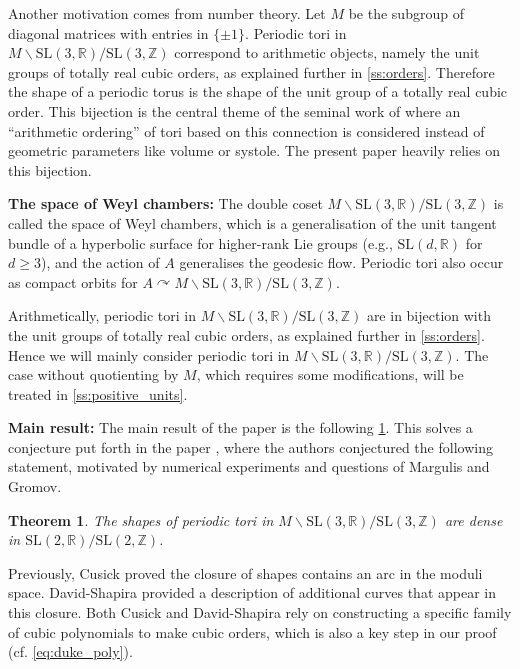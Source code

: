 \documentclass[11pt,letterpaper]{amsart}
\newtheorem{theorem}{Theorem}[section]
\theoremstyle{definition}
\theoremstyle{remark}
\renewcommand{\rm}[1]{\mathrm{#1}}
\newcommand{\cal}[1]{\mathcal{#1}}
\newcommand{\bb}[1]{\mathbb{#1}}
\newcommand{\R}{\bb R}
\newcommand{\Z}{\bb Z}
\newcommand{\calO}{\cal O}
\newcommand{\SL}{\rm{SL}}
\newcommand{\thi}{\color{olive}}
\begin{document}
	Another motivation comes from number theory.
	Let $M$ be the subgroup of diagonal matrices with entries in $\lbrace \pm 1 \rbrace$.
	Periodic tori in $M \backslash \SL(3,\R)/\SL(3,\Z)$ correspond to arithmetic objects, namely the unit groups of totally real cubic orders, as explained further in \cref{ss:orders}.
	Therefore the shape of a periodic torus is the shape of the unit group of a totally real cubic order. This bijection is the central theme of the seminal work of \cite{einsiedler_distribution_2011} where an ``arithmetic ordering'' of {tori} based on this connection is considered instead of geometric parameters like volume or systole. The present paper heavily relies on this bijection.

	
	\textbf{The space of Weyl chambers:}
	     The double coset $ M \backslash \SL(3,\R)/\SL(3,\Z)$ is called the space of Weyl chambers, which is a generalisation of the unit tangent bundle of a hyperbolic surface for higher-rank Lie groups (e.g., $\SL(d,\R)$ for $d\geq 3$), and the action of $A$ generalises the geodesic flow. Periodic tori also occur as compact orbits for $A \curvearrowright M \backslash \SL(3,\R)/\SL(3,\Z)$. 
    
	
	Arithmetically, periodic tori in $M \backslash \SL(3,\R)/\SL(3,\Z)$ are in bijection with the unit groups of totally real cubic orders, as explained further in \cref{ss:orders}. 
	Hence we will mainly consider periodic tori in $M \backslash \SL(3,\R)/\SL(3,\Z)$.
	The case without quotienting by $M$, which requires some modifications, will be treated in \cref{ss:positive_units}.
	
	
	
	\textbf{Main result:}
	{The main result of the paper is the following \cref{co:ds}.}
	This solves a conjecture put forth in the paper \cite{davidShapesUnitLattices2017}, where the authors conjectured the following statement, motivated by numerical experiments 
	and questions of Margulis and Gromov.
	\begin{theorem}
	    \label{co:ds}
		The shapes of periodic tori in $ M\backslash \SL(3,\R)/\SL(3,\Z)$ are dense in $\SL(2,\R)/\SL(2,\Z)$.
	\end{theorem}
Previously, Cusick \cite{cusickRegulatorSpectrumTotally1991} proved the closure of shapes contains an arc in the moduli space. 
{David-Shapira \cite{davidShapesUnitLattices2017} provided a description of additional curves that appear in this closure.} 
Both Cusick and David-Shapira rely on constructing a specific family of cubic polynomials to make cubic {orders}, which is also a key step in our proof (cf. \cref{eq:duke_poly}). 
\end{document}
